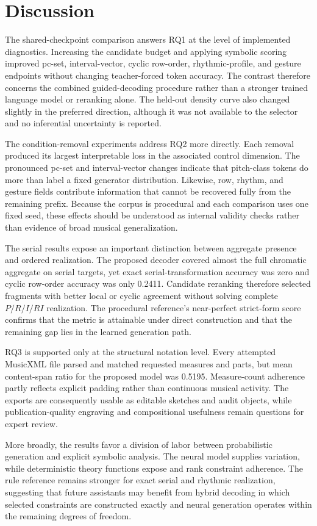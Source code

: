 \section{Discussion}
\label{sec:discussion}

The shared-checkpoint comparison answers RQ1 at the level of implemented diagnostics. Increasing the candidate budget and applying symbolic scoring improved pc-set, interval-vector, cyclic row-order, rhythmic-profile, and gesture endpoints without changing teacher-forced token accuracy. The contrast therefore concerns the combined guided-decoding procedure rather than a stronger trained language model or reranking alone. The held-out density curve also changed slightly in the preferred direction, although it was not available to the selector and no inferential uncertainty is reported.

The condition-removal experiments address RQ2 more directly. Each removal produced its largest interpretable loss in the associated control dimension. The pronounced pc-set and interval-vector changes indicate that pitch-class tokens do more than label a fixed generator distribution. Likewise, row, rhythm, and gesture fields contribute information that cannot be recovered fully from the remaining prefix. Because the corpus is procedural and each comparison uses one fixed seed, these effects should be understood as internal validity checks rather than evidence of broad musical generalization.

The serial results expose an important distinction between aggregate presence and ordered realization. The proposed decoder covered almost the full chromatic aggregate on serial targets, yet exact serial-transformation accuracy was zero and cyclic row-order accuracy was only 0.2411. Candidate reranking therefore selected fragments with better local or cyclic agreement without solving complete $P/R/I/RI$ realization. The procedural reference's near-perfect strict-form score confirms that the metric is attainable under direct construction and that the remaining gap lies in the learned generation path.

RQ3 is supported only at the structural notation level. Every attempted MusicXML file parsed and matched requested measures and parts, but mean content-span ratio for the proposed model was 0.5195. Measure-count adherence partly reflects explicit padding rather than continuous musical activity. The exports are consequently usable as editable sketches and audit objects, while publication-quality engraving and compositional usefulness remain questions for expert review.

More broadly, the results favor a division of labor between probabilistic generation and explicit symbolic analysis. The neural model supplies variation, while deterministic theory functions expose and rank constraint adherence. The rule reference remains stronger for exact serial and rhythmic realization, suggesting that future assistants may benefit from hybrid decoding in which selected constraints are constructed exactly and neural generation operates within the remaining degrees of freedom.

